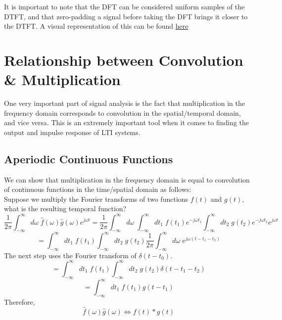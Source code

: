 \documentclass[a4paper]{article}
\numberwithin{equation}{section}
\begin{document}
It is important to note that the DFT can be considered uniform samples of the DTFT, and that zero-padding a signal before taking the DFT brings it closer to the DTFT. A visual representation of this can be found \href{https://upload.wikimedia.org/wikipedia/commons/c/ca/Fourier_transform\%2C_Fourier_series\%2C_DTFT\%2C_DFT.gif}{here}

\section{Relationship between Convolution \& Multiplication}
One very important part of signal analysis is the fact that multiplication in the frequency domain corresponds to convolution in the spatial/temporal domain, and vice versa.  This is an extremely important tool when it comes to finding the output and impulse response of LTI systems. 

\subsection{Aperiodic Continuous Functions}
We can show that multiplication in the frequency domain is equal to convolution of continuous functions in the time/spatial domain as follows:\\

Suppose we multiply the Fourier transforms of two functions $f(t)$ and $g(t)$, what is the resulting temporal function?
\begin{equation}
\frac{1}{2\pi}\int_{-\infty}^{\infty}d\omega \; \hat{f}(\omega)\hat{g}(\omega)e^{j\omega t}=\frac{1}{2\pi}\int_{-\infty}^{\infty}d\omega \; \int_{-\infty}^{\infty}dt_1\; f(t_1)e^{-j\omega t_1}\int_{-\infty}^{\infty}dt_2\; g(t_2)e^{-j\omega t_2}e^{j\omega t}
\end{equation}
\begin{equation}
= \int_{-\infty}^{\infty}dt_1\; f(t_1)\int_{-\infty}^{\infty}dt_2\; g(t_2)\frac{1}{2\pi}\int_{-\infty}^{\infty}d\omega \;e^{j\omega (t-t_1-t_2)}
\end{equation}
The next step uses the Fourier transform of $\delta(t-t_0)$. 
\begin{equation}
= \int_{-\infty}^{\infty}dt_1\; f(t_1)\int_{-\infty}^{\infty}dt_2\; g(t_2)\delta(t-t_1-t_2)
\end{equation}
\begin{equation}
= \int_{-\infty}^{\infty}dt_1\; f(t_1)g(t-t_1)
\end{equation}
Therefore,
\begin{equation}
\boxed{
\hat{f}(\omega)\hat{g}(\omega)\Longleftrightarrow f(t)*g(t)
}
\end{equation}
\end{document}
